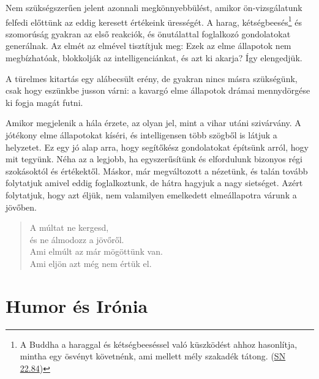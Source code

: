 Nem szükségszerűen jelent azonnali megkönnyebbülést, amikor
ön-vizsgálatunk felfedi előttünk az eddig keresett értékeink ürességét.
A harag, kétségbeesés\footnote{A Buddha a haraggal és kétségbeeséssel
  való küszködést ahhoz hasonlítja, mintha egy ösvényt követnénk, ami
  mellett mély szakadék tátong.
  (\href{https://www.accesstoinsight.org/tipitaka/sn/sn22/sn22.084.than.html}{SN
  22.84})} és szomorúság gyakran az első reakciók, és önutálattal
foglalkozó gondolatokat generálnak. Az elmét az elmével tisztítjuk meg:
Ezek az elme állapotok nem megbízhatóak, blokkolják az
intelligenciánkat, és azt ki akarja? Így elengedjük.


A türelmes kitartás egy alábecsült erény, de gyakran nincs másra
szükségünk, csak hogy eszünkbe jusson várni: a kavargó elme állapotok
drámai mennydörgése ki fogja magát futni.

Amikor megjelenik a hála érzete, az olyan jel, mint a vihar utáni
szivárvány. A jótékony elme állapotokat kíséri, és intelligensen több
szögből is látjuk a helyzetet. Ez egy jó alap arra, hogy segítőkész
gondolatokat építsünk arról, hogy mit tegyünk. Néha az a legjobb, ha
egyszerűsítünk és elfordulunk bizonyos régi szokásoktól és értékektől.
Máskor, már megváltozott a nézetünk, és talán tovább folytatjuk amivel
eddig foglalkoztunk, de hátra hagyjuk a nagy sietséget. Azért
folytatjuk, hogy azt éljük, nem valamilyen emelkedett elmeállapotra
várunk a jövőben.

\begin{quote}
A múltat ne kergesd,\\
és ne álmodozz a jövőről.\\
Ami elmúlt az már mögöttünk van.\\
Ami eljön azt még nem értük el.

\bigskip

\end{quote}

\clearpage

\section{Humor és Irónia}


